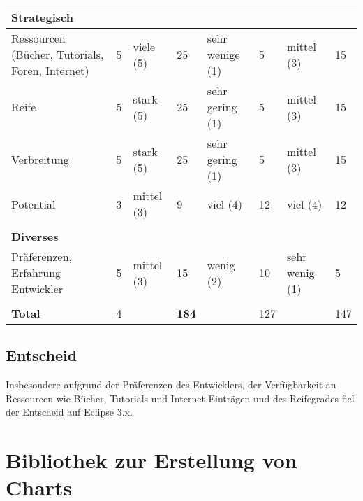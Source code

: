 \begin{longtable}{|p{2.8cm}|p{0.7cm}|p{2.1cm}|p{0.7cm}|p{2.1cm}|p{0.7cm}|p{2.2cm}|p{0.7cm}|}
\multicolumn{8}{|l|}{\textbf{Strategisch}}\\\hline
  Ressourcen (Bücher, Tutorials, Foren, Internet) & 5 & viele (5) & 25 & sehr wenige (1) &5&mittel (3)&15 \\\hline
  Reife & 5 & stark (5) & 25 & sehr gering (1) &5&mittel (3)&15 \\\hline
  Verbreitung & 5 & stark (5) & 25 & sehr gering (1) &5&mittel (3)&15 \\\hline
  Potential & 3 & mittel (3) & 9 & viel (4)  & 12 & viel (4)&12 \\\hline
 \multicolumn{8}{|l|}{}\\
\multicolumn{8}{|l|}{\textbf{Diverses}}\\\hline
  Präferenzen, Erfahrung Entwickler & 5 & mittel (3) & 15 & wenig (2) &10&sehr wenig (1)&5 \\\hline
 \multicolumn{8}{|l|}{}\\\hline 
 \textbf{Total} & 4 & &\textbf{184}&&127& & 147 \\\hline
\end{longtable}


\subsection{Entscheid}\label{rcp_entscheid}
Insbesondere aufgrund der Präferenzen des Entwicklers, der Verfügbarkeit an Ressourcen wie Bücher, Tutorials und Internet-Einträgen und des Reifegrades fiel der Entscheid auf Eclipse 3.x. 


\section{Bibliothek zur Erstellung von Charts}




